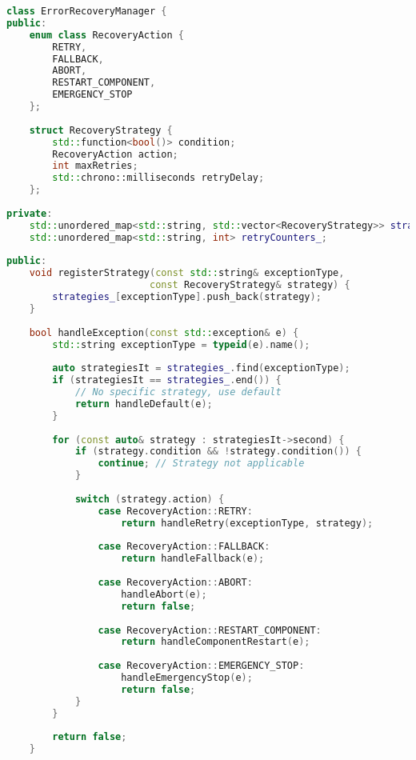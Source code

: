 \begin{lstlisting}[language=C++, caption=Error Recovery Implementation]
class ErrorRecoveryManager {
public:
    enum class RecoveryAction {
        RETRY,
        FALLBACK,
        ABORT,
        RESTART_COMPONENT,
        EMERGENCY_STOP
    };
    
    struct RecoveryStrategy {
        std::function<bool()> condition;
        RecoveryAction action;
        int maxRetries;
        std::chrono::milliseconds retryDelay;
    };
    
private:
    std::unordered_map<std::string, std::vector<RecoveryStrategy>> strategies_;
    std::unordered_map<std::string, int> retryCounters_;
    
public:
    void registerStrategy(const std::string& exceptionType, 
                         const RecoveryStrategy& strategy) {
        strategies_[exceptionType].push_back(strategy);
    }
    
    bool handleException(const std::exception& e) {
        std::string exceptionType = typeid(e).name();
        
        auto strategiesIt = strategies_.find(exceptionType);
        if (strategiesIt == strategies_.end()) {
            // No specific strategy, use default
            return handleDefault(e);
        }
        
        for (const auto& strategy : strategiesIt->second) {
            if (strategy.condition && !strategy.condition()) {
                continue; // Strategy not applicable
            }
            
            switch (strategy.action) {
                case RecoveryAction::RETRY:
                    return handleRetry(exceptionType, strategy);
                    
                case RecoveryAction::FALLBACK:
                    return handleFallback(e);
                    
                case RecoveryAction::ABORT:
                    handleAbort(e);
                    return false;
                    
                case RecoveryAction::RESTART_COMPONENT:
                    return handleComponentRestart(e);
                    
                case RecoveryAction::EMERGENCY_STOP:
                    handleEmergencyStop(e);
                    return false;
            }
        }
        
        return false;
    }
    

\end{lstlisting}
